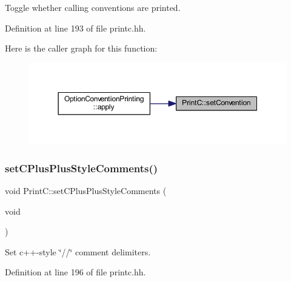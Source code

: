 Toggle whether calling conventions are printed. 



Definition at line 193 of file printc.\+hh.

Here is the caller graph for this function\+:
\nopagebreak
\begin{figure}[H]
\begin{center}
\leavevmode
\includegraphics[width=350pt]{class_print_c_a0bb81b8247d7390388474a300873b460_icgraph}
\end{center}
\end{figure}
\mbox{\label{class_print_c_a4981b566fe7893b12da7d77e8cd35dfb}} 
\subsubsection{\texorpdfstring{setCPlusPlusStyleComments()}{setCPlusPlusStyleComments()}}
{\footnotesize\ttfamily void Print\+C\+::set\+C\+Plus\+Plus\+Style\+Comments (\begin{DoxyParamCaption}\item[{void}]{ }\end{DoxyParamCaption})\hspace{0.3cm}{\ttfamily [inline]}}



Set c++-\/style \char`\"{}//\char`\"{} comment delimiters. 



Definition at line 196 of file printc.\+hh.

